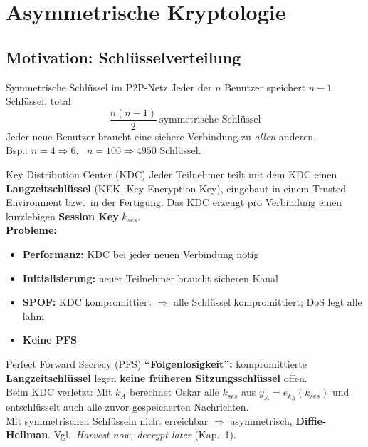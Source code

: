\documentclass[a4paper, fontsize=7pt]{scrartcl}
\begin{document}
\section{Asymmetrische Kryptologie}

\subsection{Motivation: Schlüsselverteilung}

\begin{mainbox}{Symmetrische Schlüssel im P2P-Netz}
Jeder der $n$ Benutzer speichert $n-1$ Schlüssel, total
$$\boxed{\frac{n(n-1)}{2}\ \text{symmetrische Schlüssel}}$$
Jeder neue Benutzer braucht eine sichere Verbindung zu \emph{allen} anderen.\\
Bsp.: $n = 4 \Rightarrow 6$, \ $n = 100 \Rightarrow 4950$ Schlüssel.
\end{mainbox}

\begin{mainbox}{Key Distribution Center (KDC)}
Jeder Teilnehmer teilt mit dem KDC einen \textbf{Langzeitschlüssel}
(KEK, Key Encryption Key), eingebaut in einem Trusted Environment bzw.\ in der
Fertigung. Das KDC erzeugt pro Verbindung einen kurzlebigen \textbf{Session Key}
$k_{ses}$.\\
\textbf{Probleme:}
\begin{itemize}
    \item \textbf{Performanz:} KDC bei jeder neuen Verbindung nötig
    \item \textbf{Initialisierung:} neuer Teilnehmer braucht sicheren Kanal
    \item \textbf{SPOF:} KDC kompromittiert $\Rightarrow$ alle Schlüssel
          kompromittiert; DoS legt alle lahm
    \item \textbf{Keine PFS}
\end{itemize}
\end{mainbox}

\begin{mainbox}{Perfect Forward Secrecy (PFS)}
\textbf{``Folgenlosigkeit'':} kompromittierte \textbf{Langzeitschlüssel} legen
\textbf{keine früheren Sitzungsschlüssel} offen.\\
Beim KDC verletzt: Mit $k_A$ berechnet Oskar alle
$k_{ses}$ aus $y_A = e_{k_A}(k_{ses})$ und entschlüsselt auch alle zuvor
gespeicherten Nachrichten.\\
Mit symmetrischen Schlüsseln nicht erreichbar $\Rightarrow$ asymmetrisch,
\textbf{Diffie-Hellman}. Vgl.\ \emph{Harvest now, decrypt later} (Kap.\ 1).
\end{mainbox}
\end{document}
